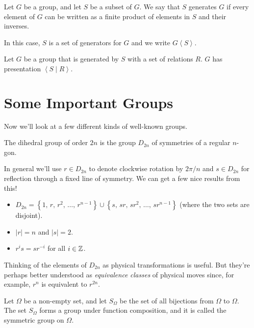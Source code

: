 \documentclass[../m171main.tex]{subfiles}
\begin{document}
\begin{definition}[Generator]
    Let $G$ be a group, and let $S$ be a subset of $G$.
    We say that $S$ generates $G$ if every element of $G$ can be written as a finite product of elements in $S$ and their inverses.

    In this case, $S$ is a set of generators for $G$ and we write $G \left< S \right>$.
\end{definition}

\begin{definition}[Presentation]
    Let $G$ be a group that is generated by $S$ with a set of relations $R$.
    $G$ has presentation $\left< S \mid R \right>$.
\end{definition}

\section{Some Important Groups}
Now we'll look at a few different kinds of well-known groups.

\begin{definition}
    The dihedral group of order $2n$ is the group $D_{2n}$ of symmetries of a regular $n$-gon.
\end{definition}

In general we'll use $r \in D_{2n}$ to denote clockwise rotation by $2\pi / n$ and $s \in D_{2n}$ for reflection through a fixed line of symmetry.
We can get a few nice results from this!
\begin{itemize}
    \item $D_{2n} = \left\{ 1, \, r, \, r^2, \, \ldots, \, r^{n-1} \right\} \cup \left\{ s, \, sr, \, sr^2, \, \ldots, \, sr^{n-1} \right\}$ (where the two sets are disjoint).
    \item $|r| = n$ and $|s| = 2$.
    \item $r^{i} s = s r^{-i}$ for all $i \in \mathbb{Z}$.
\end{itemize}
Thinking of the elements of $D_{2n}$ as physical transformations is useful.
But they're perhaps better understood as \textit{equivalence classes} of physical moves since, for example, $r^{n}$ is equivalent to $r^{2n}$.

\begin{definition}
    Let $\Omega$ be a non-empty set, and let $S_\Omega$ be the set of all bijections from $\Omega$ to $\Omega$.
    The set $S_\Omega$ forms a group under function composition, and it is called the symmetric group on $\Omega$.
\end{definition}
\end{document}
